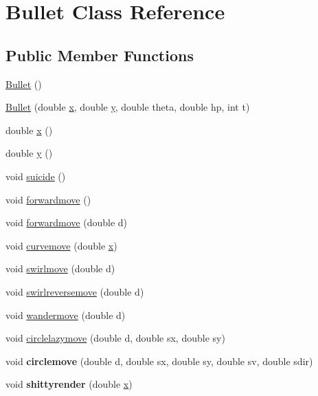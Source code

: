 \hypertarget{classBullet}{\section{Bullet Class Reference}
\label{classBullet}
}
\subsection*{Public Member Functions}
\begin{DoxyCompactItemize}
\item 
\hyperlink{classBullet_acd7befc0bc18907cc1d871d37bbdddeb}{Bullet} ()
\item 
\hyperlink{classBullet_a0e7e7107b6b2e1a08d3ec46239edfe52}{Bullet} (double \hyperlink{classBullet_a0aa7570135f0bd5074a1c75622e24454}{x}, double \hyperlink{classBullet_aebd88595fe9586d31ab1665e76ea882c}{y}, double theta, double hp, int t)
\item 
double \hyperlink{classBullet_a0aa7570135f0bd5074a1c75622e24454}{x} ()
\item 
double \hyperlink{classBullet_aebd88595fe9586d31ab1665e76ea882c}{y} ()
\item 
void \hyperlink{classBullet_a14776ff8dafe2095be4b817839c80780}{suicide} ()
\item 
void \hyperlink{classBullet_a1816186fa2652aac2fd8e3393f6eb9c8}{forwardmove} ()
\item 
void \hyperlink{classBullet_afab3ff90ec829646f2ddcae5780c08fc}{forwardmove} (double d)
\item 
void \hyperlink{classBullet_afd40911b60cb1b94399cced39cda15e4}{curvemove} (double \hyperlink{classBullet_a0aa7570135f0bd5074a1c75622e24454}{x})
\item 
void \hyperlink{classBullet_a65947d88d9efdb14e26b9c43f394a5bd}{swirlmove} (double d)
\item 
void \hyperlink{classBullet_a7d5b96cf2e74b8257b039bab379a905d}{swirlreversemove} (double d)
\item 
void \hyperlink{classBullet_a846b8719e66da3f1064f852a3559e472}{wandermove} (double d)
\item 
void \hyperlink{classBullet_a1e22d8f02ff018172ab6a46b77164a43}{circlelazymove} (double d, double sx, double sy)
\item 
\hypertarget{classBullet_a20a89015d04cfc8c9b23f85250b9816a}{void {\bfseries circlemove} (double d, double sx, double sy, double sv, double sdir)}\label{classBullet_a20a89015d04cfc8c9b23f85250b9816a}

\item 
\hypertarget{classBullet_a0dc9c1dc25866abd902acebf44f5d421}{void {\bfseries shittyrender} (double \hyperlink{classBullet_a0aa7570135f0bd5074a1c75622e24454}{x})}\label{classBullet_a0dc9c1dc25866abd902acebf44f5d421}

\end{DoxyCompactItemize}
